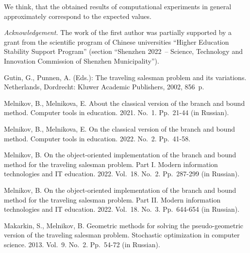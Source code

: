\documentclass[12pt]{llncs}
\begin{document}
We think, that
the obtained results of computational experiments 
in general approximately correspond to the expected values.

\medskip

\textit{Acknowledgement.}
The work of the first author 
was partially supported by a grant 
from the scientific program of Chinese universities
``Higher Education Stability Support Program''
(section ``Shenzhen 2022~-- Science, Technology 
and Innovation Commission of Shenzhen Municipality'').

%
%
\begin{thebibliography}{5}

Gutin, G., Punnen, A. (Eds.):
The traveling salesman problem and its variations.
Netherlands, Dordrecht: Kluwer Academic Publishers, 2002, 856~p.

Melnikov, B., Melnikova, E.
About the classical version of the branch and bound method.
Computer tools in education. 
2021. No.~1. Pp.~21-44 (in Russian).

Melnikov, B., Melnikova, E.
On the classical version of the branch and bound method.
Computer tools in education. 
2022. No.~2. Pp.~41-58.

Melnikov, B.
On the object-oriented implementation
of the branch and bound method 
for the traveling salesman problem. Part I.
Modern information technologies and IT education. 
2022. Vol.~18. No.~2. Pp.~287-299 (in Russian).

Melnikov, B.
On the object-oriented implementation
of the branch and bound method 
for the traveling salesman problem. Part II.
Modern information technologies and IT education. 
2022. Vol.~18. No.~3. Pp.~644-654 (in Russian).

Makarkin, S., Melnikov, B.
Geometric methods for solving the pseudo-geometric version 
of the traveling salesman problem.
Stochastic optimization in computer science. 
2013. Vol.~9. No.~2. Pp.~54-72 (in Russian).
\end{thebibliography}

\end{document}
